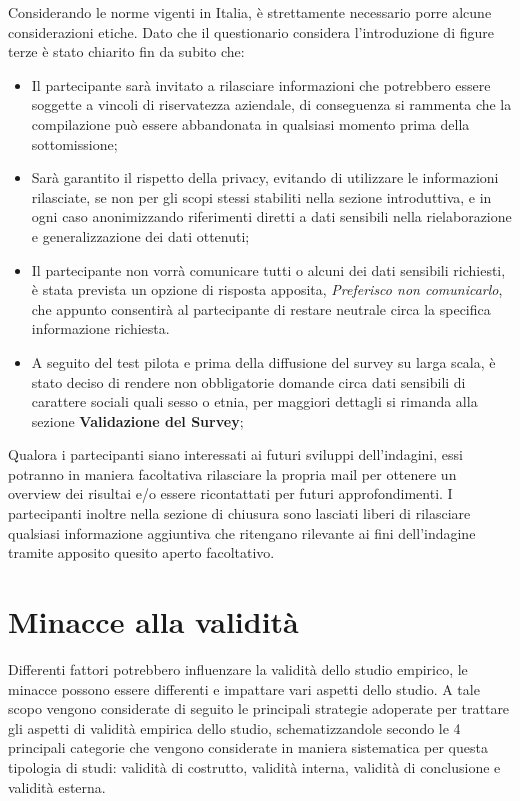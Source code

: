     Considerando le norme vigenti in Italia, è strettamente necessario porre alcune considerazioni etiche.
    Dato che il questionario considera l'introduzione di figure terze è stato chiarito fin da subito che:
    \begin{itemize}
        \item  Il partecipante sarà invitato a rilasciare informazioni che potrebbero essere soggette a vincoli di riservatezza aziendale, di conseguenza si rammenta che la compilazione può essere abbandonata in qualsiasi momento prima della sottomissione;
        \item Sarà garantito il rispetto della privacy, evitando di utilizzare le informazioni rilasciate, se non per gli scopi stessi stabiliti nella sezione introduttiva, e in ogni caso anonimizzando  riferimenti diretti a dati sensibili nella rielaborazione e generalizzazione dei dati ottenuti;
        \item Il partecipante non vorrà comunicare tutti o alcuni dei dati sensibili richiesti, è stata prevista un opzione di risposta apposita, \emph{Preferisco non comunicarlo}, che appunto consentirà al partecipante di restare neutrale circa la specifica informazione richiesta.
        \item A seguito del test pilota e prima della diffusione del survey su larga scala, è stato deciso di rendere non obbligatorie domande circa dati sensibili di carattere sociali quali sesso o etnia, per maggiori dettagli si rimanda alla sezione \textbf{Validazione del Survey};
    \end{itemize}
    
    Qualora i partecipanti siano interessati ai futuri sviluppi dell'indagini, essi potranno in maniera facoltativa rilasciare la propria mail per ottenere un overview dei risultai e/o essere ricontattati per futuri approfondimenti. I partecipanti inoltre nella sezione di chiusura sono lasciati liberi di rilasciare qualsiasi informazione aggiuntiva che ritengano rilevante ai fini dell'indagine tramite apposito quesito aperto facoltativo.
    
    

   
   
   
    
   

    
\section{Minacce alla validità}
Differenti fattori potrebbero influenzare la validità dello studio empirico, le minacce possono essere differenti e impattare vari aspetti dello studio. A tale scopo vengono considerate di seguito le principali strategie adoperate per trattare gli aspetti di validità empirica dello studio, schematizzandole secondo le 4 principali categorie che vengono considerate in maniera sistematica per questa tipologia di studi: validità di costrutto, validità interna, validità di conclusione e validità esterna.

